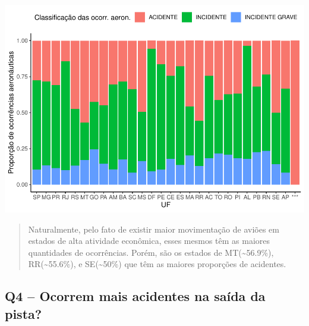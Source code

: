 \documentclass[
]{article}
\newenvironment{Shaded}{\begin{snugshade}}{\end{snugshade}}
\newcommand{\AttributeTok}[1]{\textcolor[rgb]{0.77,0.63,0.00}{#1}}
\newcommand{\ControlFlowTok}[1]{\textcolor[rgb]{0.13,0.29,0.53}{\textbf{#1}}}
\newcommand{\FunctionTok}[1]{\textcolor[rgb]{0.00,0.00,0.00}{#1}}
\newcommand{\NormalTok}[1]{#1}
\newcommand{\OtherTok}[1]{\textcolor[rgb]{0.56,0.35,0.01}{#1}}
\newcommand{\SpecialCharTok}[1]{\textcolor[rgb]{0.00,0.00,0.00}{#1}}
\newcommand{\StringTok}[1]{\textcolor[rgb]{0.31,0.60,0.02}{#1}}
\begin{document}
\begin{center}\includegraphics{4.Relatorio/pdf/index_files/figure-latex/unnamed-chunk-32-1} \end{center}

\begin{quote}
Naturalmente, pelo fato de existir maior movimentação de aviões em
estados de alta atividade econômica, esses mesmos têm as maiores
quantidades de ocorrências. Porém, são os estados de
MT(\textasciitilde56.9\%), RR(\textasciitilde55.6\%), e
SE(\textasciitilde50\%) que têm as maiores proporções de acidentes.
\end{quote}

\hypertarget{q4-ocorrem-mais-acidentes-na-sauxedda-da-pista}{%
\subsection{Q4 -- Ocorrem mais acidentes na saída da
pista?}\label{q4-ocorrem-mais-acidentes-na-sauxedda-da-pista}}

\begin{Shaded}
\end{Shaded}
\end{document}
